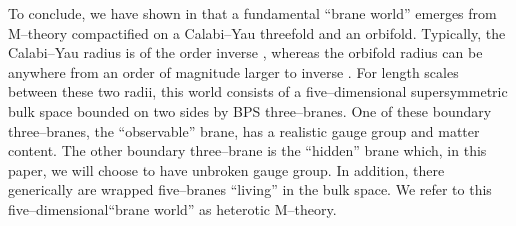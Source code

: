 \documentclass[a4paper,12pt]{article}
\numberwithin{equation}{section}
\theoremstyle{plain}
\begin{document}
To conclude, we have shown in \cite{losw1, losw2, nse} 
that a fundamental ``brane world'' emerges from
M--theory compactified on a Calabi--Yau threefold and an \coordHE{}
orbifold. Typically, the Calabi--Yau
radius is of the order inverse \coordHE{}, whereas the orbifold radius can
be anywhere from an order of magnitude larger to inverse 
\coordHE{} \cite{scales}. For
length scales between these two radii, 
this world consists of a five--dimensional \coordHE{} supersymmetric bulk
space bounded on two sides by BPS three--branes. One of these boundary 
three--branes, the ``observable'' brane, has  a realistic gauge group 
and matter content. The other boundary three--brane is the ``hidden'' brane
which, in this paper, we will choose to have unbroken \coordHE{} gauge group. 
In addition, there generically are wrapped five--branes ``living''
in the bulk space.  We refer to this five--dimensional``brane world'' 
as heterotic M--theory.
\end{document}
